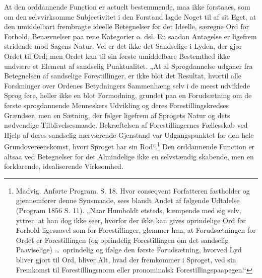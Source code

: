 \documentclass[12pt]{book}
\newcommand{\opage}[1]{\marginnote{\footnotesize\textit{[#1]}}}
\begin{document}
At den orddannende Function er actuelt bestemmende,
maa ikke forstaaes, som om den selvvirksomme Subjectivitet i
den Forstand lagde Noget til af sit Eget, at den umiddelbart
frembragte ideelle Betegnelser for det Ideelle, særegne Ord
for Forhold, Benævnelser paa rene Kategorier o. dsl. En
saadan Antagelse er ligefrem stridende mod Sagens Natur.
Vel er det ikke det Sandselige i Lyden, der gjør Ordet til
Ord; men Ordet kan til sin første umiddelbare Bestemthed ikke
undvære et Element af sandselig Punktualitet. „At al
Sprogdannelse udgaaer fra Betegnelsen af sandselige Forestillinger,
er ikke blot det Resultat, hvortil alle Forskninger over Ordenes
Betydningers Sammenhæng selv i de meest udviklede Sprog
føre, heller ikke en blot Formodning, grundet paa en
Forudsætning om de første sprogdannende Menneskers Udvikling og
deres Forestillingskredses Grændser, men en Sætning, der
følger ligefrem af Sprogets Natur og dets nødvendige
Tilblivelsesmaade. Bekræftelsen af Forestillingernes
Fællesskab ved Hjelp af deres sandselig nærværende Gjenstand
var Udgangspunktet for den hele Grundovereenskomst, hvori
Sproget har sin Rod“.\footnote{%
Madvig. Anførte Program. S. 18. Hvor conseqvent Forfatteren
fastholder og gjennemfører denne Synsmaade, sees blandt Andet af
følgende Udtalelse (Program 1856 S. 11). „Naar Humboldt
etsteds, kæmpende med sig selv, yttrer, at han dog ikke seer, hvorfor
der ikke kan gives oprindelige Ord for Forhold ligesaavel som for
Forestillinger, glemmer han, at Forudsætningen for Ordet er
Forestillingen (og oprindelig Forestillingen om det sandselig
Paaviselige) \ldots\ oprindelig og ifølge den første Forudsætning, hvorved Lyd
bliver gjort til Ord, bliver Alt, hvad der fremkommer i Sproget,
ved sin Fremkomst til Forestillingsnorm eller pronominalsk
Forestillingspaapegen.“} Den orddannende Function
er altsaa ved Betegnelser for det Almindelige ikke en
\opage{33}selvstændig skabende, men en forklarende, idealiserende
Virksomhed.
\end{document}
